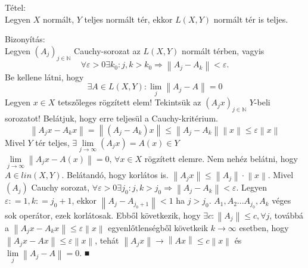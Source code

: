 \documentclass[12pt,a4paper]{scrartcl}
\newenvironment{tetel}{}{}
\newenvironment{bizonyitas}{}{}
\begin{document}
\begin{tetel}

Tétel:\\
Legyen \(X\) normált, \(Y\) teljes normált tér, ekkor
\(L\left( {X,Y} \right)\) normált tér is teljes.

\end{tetel}

\begin{bizonyitas}

Bizonyítás:\\
Legyen \(\left( A_{j} \right)_{j \in {\mathbb{N}}}\) Cauchy-sorozat az
\(L\left( {X,Y} \right)\) normált térben, vagyis
\[\left. \forall\varepsilon > 0\exists k_{0}:j,k > k_{0}\Rightarrow\left\| {A_{j} - A_{k}} \right\| < \varepsilon. \right.\]
Be kellene látni, hogy
\[\exists A \in L\left( {X,Y} \right):\underset{j}{\lim}\left\| {A_{j} - A} \right\| = 0\]
Legyen \(x \in X\) tetszőleges rögzített elem! Tekintsük az
\(\left( {A_{j}x} \right)_{j \in {\mathbb{N}}}\) \(Y\)-beli sorozatot!
Belátjuk, hogy erre teljesül a Cauchy-kritérium.
\[\left\| {A_{j}x - A_{k}x} \right\| = \left\| {\left( {A_{j} - A_{k}} \right)x} \right\| \leq \left\| {A_{j} - A_{k}} \right\|\left\| x \right\| \leq \varepsilon\left\| x \right\|\]
Mivel \(Y\) tér teljes,
\(\exists\underset{j\rightarrow\infty}{\lim}\left( {A_{j}x} \right) = A\left( x \right) \in Y\)
\(\lim\limits_{j\rightarrow\infty}\left\| {A_{j}x - A\left( x \right)} \right\| = 0,\,\forall x \in X\)
rögzített elemre. Nem nehéz belátni, hogy
\(A \in {lin}\left( {X,Y} \right)\). Belátandó, hogy korlátos is.
\(\left\| {A_{j}x} \right\| \leq \left\| A_{j} \right\| \cdot \left\| x \right\|\).
Mivel \(\left( A_{j} \right)\) Cauchy sorozat,
\(\left. \forall\varepsilon > 0\exists j_{0}:j,k > j_{0}\Rightarrow\left\| {A_{j} - A_{k}} \right\| < \varepsilon \right.\).
Legyen \(\varepsilon: = 1,k: = j_{0} + 1\), ekkor
\(\left\| {A_{j} - A_{j_{0} + 1}} \right\| < 1\) ha \(j > j_{0}\).
\(A_{1},A_{2}...A_{j_{0}},A_{k}\) véges sok operátor, ezek korlátosak.
Ebből következik, hogy
\(\exists c:\left\| A_{j} \right\| \leq c,\forall j\), továbbá a
\(\left\| {A_{j}x - A_{k}x} \right\| \leq \varepsilon\left\| x \right\|\)
egyenlőtlenségből követkeik \(\left. k\rightarrow\infty \right.\)
esetben, hogy
\(\left\| {A_{j}x - Ax} \right\| \leq \varepsilon\left\| x \right\|\),
tehát
\(\left. \left\| {A_{j}x} \right\|\rightarrow\left\| {Ax} \right\| \leq c\left\| x \right\| \right.\)
és \(\underset{j}{\lim}\left\| {A_{j} - A} \right\| = 0\). ■

\end{bizonyitas}
\end{document}
